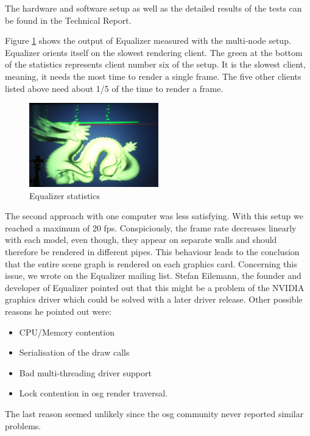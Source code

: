 The hardware and software setup as well as the detailed results of the tests can be found in the Technical Report.

Figure \ref{fig:eq_stats} shows the output of Equalizer measured with the multi-node setup. Equalizer orients itself on the slowest rendering client. The green at the bottom of the statistics represents client number six of the setup. It is the slowest client, meaning, it needs the most time to render a single frame. The five other clients listed above need about 1/5 of the time to render a frame.

\begin{figure}[H]
	\centering
	\includegraphics[width=0.5\textwidth]{../figures/fotos/eqStats}
	\caption{Equalizer statistics}
	\label{fig:eq_stats}
\end{figure}
	
The second approach with one computer was less satisfying. With this setup we reached a maximum of 20 \gls{fps}. Conspiciously, the frame rate decreases linearly with each model, even though, they appear on separate walls and should therefore be rendered in different pipes. This behaviour leads to the conclusion that the entire scene graph is rendered on each graphics card. Concerning this issue, we wrote on the Equalizer mailing list. Stefan Eilemann, the founder and developer of Equalizer pointed out that this might be a problem of the NVIDIA graphics driver which could be solved with a later driver release. Other possible reasons he pointed out were:

\begin{itemize}
	\item CPU/Memory contention
	\item Serialisation of the draw calls
	\item Bad multi-threading driver support
	\item Lock contention in \gls{osg} render traversal.
\end{itemize}

The last reason seemed unlikely since the \gls{osg} community never reported similar problems.


